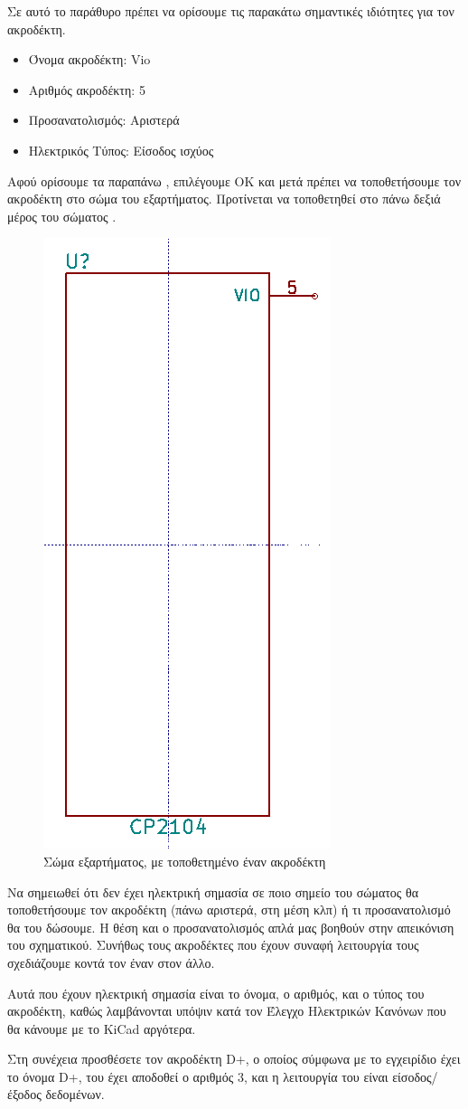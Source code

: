 \documentclass[a4paper]{article}
\begin{document}
Σε αυτό το παράθυρο πρέπει να ορίσουμε τις παρακάτω σημαντικές ιδιότητες για τον ακροδέκτη.

\begin{itemize}
    \item Όνομα ακροδέκτη: Vio
    \item Αριθμός ακροδέκτη: 5
    \item Προσανατολισμός: Αριστερά
    \item Ηλεκτρικός Τύπος: Είσοδος ισχύος
\end{itemize}

Αφού ορίσουμε τα παραπάνω , επιλέγουμε ΟΚ και μετά πρέπει να τοποθετήσουμε τον ακροδέκτη στο σώμα του εξαρτήματος. Προτίνεται να τοποθετηθεί στο πάνω δεξιά μέρος του σώματος \label{fig:libed-circ-vioplaced}.

\begin{figure}
  \begin{center}
    \includegraphics[width=.2\textwidth]{img/libed-circ-vioplaced.png}
    \caption{Σώμα εξαρτήματος, με τοποθετημένο έναν ακροδέκτη}
    \label{fig:libed-circ-vioplaced}
  \end{center}
\end{figure}

Να σημειωθεί ότι δεν έχει ηλεκτρική σημασία σε ποιο σημείο του σώματος θα τοποθετήσουμε τον ακροδέκτη (πάνω αριστερά, στη μέση κλπ) ή τι προσανατολισμό θα του δώσουμε. Η θέση και ο προσανατολισμός απλά μας βοηθούν στην απεικόνιση του σχηματικού. Συνήθως τους ακροδέκτες που έχουν συναφή λειτουργία τους σχεδιάζουμε κοντά τον έναν στον άλλο.

Αυτά που έχουν ηλεκτρική σημασία είναι το όνομα, ο αριθμός, και ο τύπος του ακροδέκτη, καθώς λαμβάνονται υπόψιν κατά τον Έλεγχο Ηλεκτρικών Κανόνων που θα κάνουμε με το \textenglish{KiCad} αργότερα.

Στη συνέχεια προσθέσετε τον ακροδέκτη D+, ο οποίος σύμφωνα με το εγχειρίδιο έχει το όνομα D+, του έχει αποδοθεί ο αριθμός 3, και η λειτουργία του είναι είσοδος/έξοδος δεδομένων.
\end{document}

